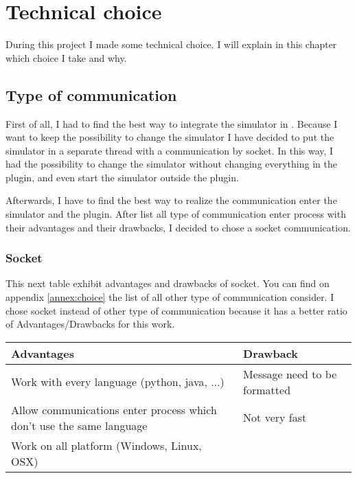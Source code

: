 
\chapter{Technical choice }
\label{chap:choice}
During this project I made some technical choice. I will explain in this chapter which choice I take and why.

\section{Type of communication}

First of all, I had to find the best way to integrate the simulator in \umld. Because I want to keep the possibility to change the simulator I have decided to put the simulator in a separate thread with a communication by socket. In this way, I had the possibility to change the simulator without changing everything in the plugin, and even start the simulator outside the plugin.

Afterwards, I have to find the best way to realize the communication enter the simulator and the plugin. After list all type of communication enter process with their advantages and their drawbacks, I decided to chose a socket communication.%




\subsection{Socket}

This next table exhibit advantages and drawbacks of socket. You can find on appendix \ref{annex:choice} the list of all other type of communication consider. I chose socket instead of other type of communication because it has a better ratio of Advantages/Drawbacks for this work.
~\\

\begin{tabular}{|p{}||p{}|}
  \hline
  \textbf{Advantages}&\textbf{Drawback}\\
  \hline
  Work with every language (python, java, ...) & Message need to be formatted\\
  \hline
  Allow communications enter process which don't use the same language& Not very fast\\
  \hline
  Work on all platform (Windows, Linux, OSX)&\\
  \hline
\end{tabular}


